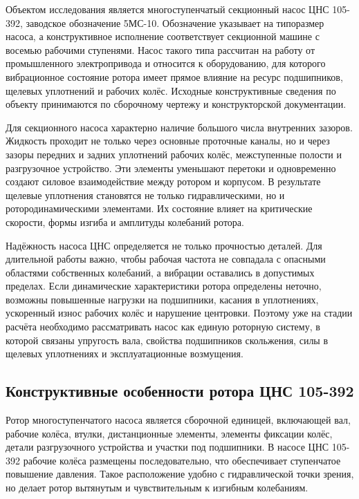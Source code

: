 Объектом исследования является многоступенчатый секционный насос ЦНС 105-392, заводское обозначение 5МС-10. Обозначение указывает на типоразмер насоса, а конструктивное исполнение соответствует секционной машине с восемью рабочими ступенями. Насос такого типа рассчитан на работу от промышленного электропривода и относится к оборудованию, для которого вибрационное состояние ротора имеет прямое влияние на ресурс подшипников, щелевых уплотнений и рабочих колёс. Исходные конструктивные сведения по объекту принимаются по сборочному чертежу и конструкторской документации.

Для секционного насоса характерно наличие большого числа внутренних зазоров. Жидкость проходит не только через основные проточные каналы, но и через зазоры передних и задних уплотнений рабочих колёс, межступенные полости и разгрузочное устройство. Эти элементы уменьшают перетоки и одновременно создают силовое взаимодействие между ротором и корпусом. В результате щелевые уплотнения становятся не только гидравлическими, но и ротородинамическими элементами. Их состояние влияет на критические скорости, формы изгиба и амплитуды колебаний ротора.

Надёжность насоса ЦНС определяется не только прочностью деталей. Для длительной работы важно, чтобы рабочая частота не совпадала с опасными областями собственных колебаний, а вибрации оставались в допустимых пределах. Если динамические характеристики ротора определены неточно, возможны повышенные нагрузки на подшипники, касания в уплотнениях, ускоренный износ рабочих колёс и нарушение центровки. Поэтому уже на стадии расчёта необходимо рассматривать насос как единую роторную систему, в которой связаны упругость вала, свойства подшипников скольжения, силы в щелевых уплотнениях и эксплуатационные возмущения.

\subsection{Конструктивные особенности ротора ЦНС 105-392}

Ротор многоступенчатого насоса является сборочной единицей, включающей вал, рабочие колёса, втулки, дистанционные элементы, элементы фиксации колёс, детали разгрузочного устройства и участки под подшипники. В насосе ЦНС 105-392 рабочие колёса размещены последовательно, что обеспечивает ступенчатое повышение давления. Такое расположение удобно с гидравлической точки зрения, но делает ротор вытянутым и чувствительным к изгибным колебаниям.

